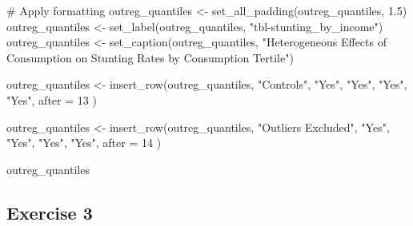 \documentclass[
  letterpaper,
  DIV=11,
  numbers=noendperiod]{scrartcl}
\newenvironment{Shaded}{\begin{snugshade}}{\end{snugshade}}
\newcommand{\AttributeTok}[1]{\textcolor[rgb]{0.40,0.45,0.13}{#1}}
\newcommand{\CommentTok}[1]{\textcolor[rgb]{0.37,0.37,0.37}{#1}}
\newcommand{\DecValTok}[1]{\textcolor[rgb]{0.68,0.00,0.00}{#1}}
\newcommand{\FloatTok}[1]{\textcolor[rgb]{0.68,0.00,0.00}{#1}}
\newcommand{\FunctionTok}[1]{\textcolor[rgb]{0.28,0.35,0.67}{#1}}
\newcommand{\NormalTok}[1]{\textcolor[rgb]{0.00,0.23,0.31}{#1}}
\newcommand{\OtherTok}[1]{\textcolor[rgb]{0.00,0.23,0.31}{#1}}
\newcommand{\StringTok}[1]{\textcolor[rgb]{0.13,0.47,0.30}{#1}}
\begin{document}
\begin{Shaded}
\begin{Highlighting}[]
\CommentTok{\# Apply formatting}
\NormalTok{outreg\_quantiles }\OtherTok{\textless{}{-}} \FunctionTok{set\_all\_padding}\NormalTok{(outreg\_quantiles, }\FloatTok{1.5}\NormalTok{)}
\NormalTok{outreg\_quantiles }\OtherTok{\textless{}{-}} \FunctionTok{set\_label}\NormalTok{(outreg\_quantiles, }\StringTok{"tbl{-}stunting\_by\_income"}\NormalTok{)}
\NormalTok{outreg\_quantiles }\OtherTok{\textless{}{-}} \FunctionTok{set\_caption}\NormalTok{(outreg\_quantiles, }\StringTok{"Heterogeneous Effects of Consumption on Stunting Rates by Consumption Tertile"}\NormalTok{)}

\NormalTok{outreg\_quantiles }\OtherTok{\textless{}{-}} \FunctionTok{insert\_row}\NormalTok{(outreg\_quantiles, }
  \StringTok{"Controls"}\NormalTok{, }\StringTok{"Yes"}\NormalTok{, }\StringTok{"Yes"}\NormalTok{, }\StringTok{"Yes"}\NormalTok{, }\StringTok{"Yes"}\NormalTok{, }
  \AttributeTok{after =} \DecValTok{13}
\NormalTok{)}

\NormalTok{outreg\_quantiles }\OtherTok{\textless{}{-}} \FunctionTok{insert\_row}\NormalTok{(outreg\_quantiles, }
  \StringTok{"Outliers Excluded"}\NormalTok{, }\StringTok{"Yes"}\NormalTok{, }\StringTok{"Yes"}\NormalTok{, }\StringTok{"Yes"}\NormalTok{, }\StringTok{"Yes"}\NormalTok{, }
  \AttributeTok{after =} \DecValTok{14}
\NormalTok{)}

\NormalTok{outreg\_quantiles}
\end{Highlighting}
\end{Shaded}

\subsection{Exercise 3}\label{exercise-3}
\end{document}
